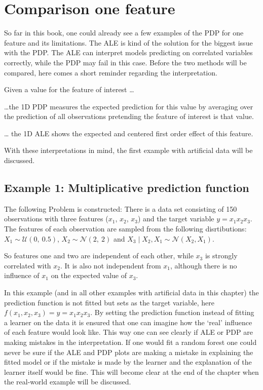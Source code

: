 \documentclass[]{krantz}
\begin{document}
\section{Comparison one feature}\label{comparison-one-feature}

So far in this book, one could already see a few examples of the PDP for
one feature and its limitations. The ALE is kind of the solution for the
biggest issue with the PDP. The ALE can interpret models predicting on
correlated variables correctly, while the PDP may fail in this case.
Before the two methods will be compared, here comes a short reminder
regarding the interpretation.

Given a value for the feature of interest \ldots{}

\ldots{}the 1D PDP measures the expected prediction for this value by
averaging over the prediction of all observations pretending the feature
of interest is that value.

\ldots{} the 1D ALE shows the expected and centered first order effect
of this feature.

With these interpretations in mind, the first example with artificial
data will be discussed.

\subsection{Example 1: Multiplicative prediction
function}\label{example-1-multiplicative-prediction-function}

The following Problem is constructed: There is a data set consisting of
150 observations with three features (\(x_1\), \(x_2\), \(x_3\)) and the
target variable \(y = x_1 x_2 x_3\). The features of each observation
are sampled from the following disrtibutions:
\(X_1 \sim \mathcal{U}(0,~0.5)\), \(X_2 \sim \mathcal{N}(2,~2)\) and
\(X_3\mid X_2, X_1 \sim \mathcal{N}(X_2,X_1)\).

So features one and two are independent of each other, while \(x_3\) is
strongly correlated with \(x_2\). It is also not independent from
\(x_1\), although there is no influence of \(x_1\) on the expected value
of \(x_3\).

In this example (and in all other examples with artificial data in this
chapter) the prediction function is not fitted but sets as the target
variable, here \(f(x_1, x_2, x_3) = y = x_1 x_2 x_3\). By setting the
prediction function instead of fitting a learner on the data it is
ensured that one can imagine how the `real' influence of each feature
would look like. This way one can see clearly if ALE or PDP are making
mistakes in the interpretation. If one would fit a random forest one
could never be sure if the ALE and PDP plots are making a mistake in
explaining the fitted model or if the mistake is made by the learner and
the explanation of the learner itself would be fine. This will become
clear at the end of the chapter when the real-world example will be
discussed.
\end{document}
